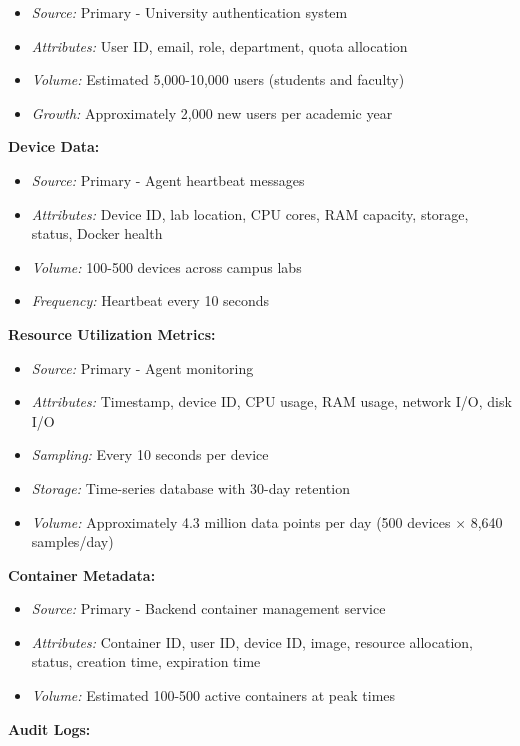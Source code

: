 \documentclass[12pt,a4paper]{article}
\begin{document}
\begin{itemize}
    \item \textit{Source:} Primary - University authentication system
    \item \textit{Attributes:} User ID, email, role, department, quota allocation
    \item \textit{Volume:} Estimated 5,000-10,000 users (students and faculty)
    \item \textit{Growth:} Approximately 2,000 new users per academic year
\end{itemize}

\textbf{Device Data:}

\begin{itemize}
    \item \textit{Source:} Primary - Agent heartbeat messages
    \item \textit{Attributes:} Device ID, lab location, CPU cores, RAM capacity, storage, status, Docker health
    \item \textit{Volume:} 100-500 devices across campus labs
    \item \textit{Frequency:} Heartbeat every 10 seconds
\end{itemize}

\textbf{Resource Utilization Metrics:}

\begin{itemize}
    \item \textit{Source:} Primary - Agent monitoring
    \item \textit{Attributes:} Timestamp, device ID, CPU usage, RAM usage, network I/O, disk I/O
    \item \textit{Sampling:} Every 10 seconds per device
    \item \textit{Storage:} Time-series database with 30-day retention
    \item \textit{Volume:} Approximately 4.3 million data points per day (500 devices $\times$ 8,640 samples/day)
\end{itemize}

\textbf{Container Metadata:}

\begin{itemize}
    \item \textit{Source:} Primary - Backend container management service
    \item \textit{Attributes:} Container ID, user ID, device ID, image, resource allocation, status, creation time, expiration time
    \item \textit{Volume:} Estimated 100-500 active containers at peak times
\end{itemize}
\textbf{Audit Logs:}
\end{document}
